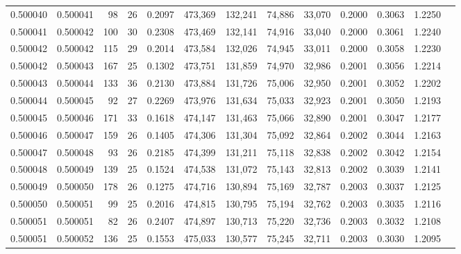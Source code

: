 \begin{tabular}{rrrrrrrrrrrrr}
0.500040 & 0.500041 &  98 &  26 &                                     0.2097 & 473,369 & 132,241 &  74,886 &  33,070 & 0.2000 & 0.3063 & 1.2250 \\
0.500041 & 0.500042 & 100 &  30 &                                     0.2308 & 473,469 & 132,141 &  74,916 &  33,040 & 0.2000 & 0.3061 & 1.2240 \\
0.500042 & 0.500042 & 115 &  29 &                                     0.2014 & 473,584 & 132,026 &  74,945 &  33,011 & 0.2000 & 0.3058 & 1.2230 \\
0.500042 & 0.500043 & 167 &  25 &                                     0.1302 & 473,751 & 131,859 &  74,970 &  32,986 & 0.2001 & 0.3056 & 1.2214 \\
0.500043 & 0.500044 & 133 &  36 &                                     0.2130 & 473,884 & 131,726 &  75,006 &  32,950 & 0.2001 & 0.3052 & 1.2202 \\
0.500044 & 0.500045 &  92 &  27 &                                     0.2269 & 473,976 & 131,634 &  75,033 &  32,923 & 0.2001 & 0.3050 & 1.2193 \\
0.500045 & 0.500046 & 171 &  33 &                                     0.1618 & 474,147 & 131,463 &  75,066 &  32,890 & 0.2001 & 0.3047 & 1.2177 \\
0.500046 & 0.500047 & 159 &  26 &                                     0.1405 & 474,306 & 131,304 &  75,092 &  32,864 & 0.2002 & 0.3044 & 1.2163 \\
0.500047 & 0.500048 &  93 &  26 &                                     0.2185 & 474,399 & 131,211 &  75,118 &  32,838 & 0.2002 & 0.3042 & 1.2154 \\
0.500048 & 0.500049 & 139 &  25 &                                     0.1524 & 474,538 & 131,072 &  75,143 &  32,813 & 0.2002 & 0.3039 & 1.2141 \\
0.500049 & 0.500050 & 178 &  26 &                                     0.1275 & 474,716 & 130,894 &  75,169 &  32,787 & 0.2003 & 0.3037 & 1.2125 \\
0.500050 & 0.500051 &  99 &  25 &                                     0.2016 & 474,815 & 130,795 &  75,194 &  32,762 & 0.2003 & 0.3035 & 1.2116 \\
0.500051 & 0.500051 &  82 &  26 &                                     0.2407 & 474,897 & 130,713 &  75,220 &  32,736 & 0.2003 & 0.3032 & 1.2108 \\
0.500051 & 0.500052 & 136 &  25 &                                     0.1553 & 475,033 & 130,577 &  75,245 &  32,711 & 0.2003 & 0.3030 & 1.2095 \\

\end{tabular}
